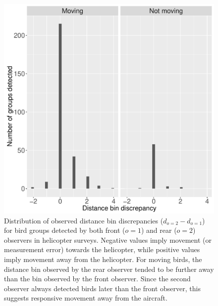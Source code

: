 \documentclass[12pt,fleqn]{article}
\begin{document}
\begin{figure}
\begin{center}
\includegraphics[width=150mm]{Dist_error_hists_JABES.pdf}
\caption{Distribution of observed distance bin discrepancies ($d_{o=2} - d_{o=1}$) for bird groups detected by both front ($o=1$) and rear ($o=2$) observers in helicopter surveys. Negative values imply movement (or measurement error) towards the helicopter, while positive values imply movement away from the helicopter. For moving birds, the distance bin observed by the rear observer tended to be further away than the bin observed by the front observer.  Since the second observer always detected birds later than the front observer, this suggests responsive movement away from the aircraft. }
\label{fig:dist_hists}
\end{center}
\end{figure}
\end{document}
